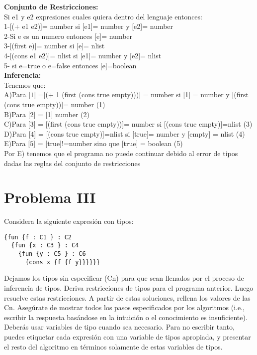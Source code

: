 \documentclass{article}
\begin{document}
\textbf {Conjunto de Restricciones: }
\\
Si e1 y e2 expresiones cuales quiera dentro del lenguaje entonces:
 \\
 1-[(+ e1 e2)]= number si [e1]= number y [e2]= number
 \\
 2-Si e es un numero entonces [e]= number
 \\
 3-[(first e)]= number si [e]= nlist
 \\
 4-[(cons e1 e2)]= nlist si [e1]= number y [e2]= nlist
 \\
 5- si e=true o e=false entonces [e]=boolean 
 \\
\textbf{Inferencia: }
  \\
  Tenemos que: 
  \\
  A)Para [$\boxed{1}$] =[(+ 1 (first (cons true empty)))] = number si [1] = number y [(first (cons true empty))]= number (1)\\ 
  B)Para [$\boxed{2}$] = [1] number (2)\\
  C)Para [$\boxed{3}$] = [(first (cons true empty))]= number si [(cons true empty)]=nlist (3)\\
  D)Para [$\boxed{4}$] = [(cons true empty)]=nlist si [true]= number y [empty] = nlist (4)\\
  E)Para [$\boxed{5}$] = [true]!=number sino que [true] = boolean (5)\\
  Por E) tenemos que el programa no puede continuar debido al error de tipos dadas las reglas del conjunto de restricciones
    
  

\section*{Problema III}
Considera la siguiente expresión con tipos:

\begin{verbatim}
{fun {f : C1 } : C2
  {fun {x : C3 } : C4
    {fun {y : C5 } : C6
      {cons x {f {f y}}}}}}
\end{verbatim}

Dejamos los tipos sin especificar (Cn) para que sean llenados por el proceso
de inferencia de tipos. Deriva restricciones de tipos para el programa anterior.
Luego resuelve estas restricciones. A partir de estas soluciones, rellena los
valores de las Cn. Asegúrate de mostrar todos los pasos especificados por los
algoritmos (i.e., escribir la respuesta basándose en la intuición o el conocimiento
es insuficiente). Deberás usar variables de tipo cuando sea necesario.
Para no escribir tanto, puedes etiquetar cada expresión con una variable de tipos
apropiada, y presentar el resto del algoritmo en términos solamente de estas
variables de tipos.
\end{document}
